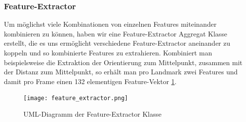 \subsubsection{Feature-Extractor}
Um möglichst viele Kombinationen von einzelnen Features miteinander kombinieren zu können, haben wir eine Feature-Extractor Aggregat
Klasse erstellt, die es uns ermöglicht verschiedene Feature-Extractor aneinander zu koppeln und so kombinierte Features zu extrahieren.
Kombiniert man beispielsweise die Extraktion der Orientierung zum Mittelpunkt, zusammen mit der Distanz zum Mittelpunkt, so erhält man
pro Landmark zwei Features und damit pro Frame einen 132 elementigen Feature-Vektor \ref{Implementierung.Feature-Extractor}.\newline

\begin{figure}
\begin{center}
\texttt{[image: feature\_extractor.png]}
\caption{UML-Diagramm der Feature-Extractor Klasse}
\end{center}
\label{Implementierung.Feature-Extractor}
\end{figure}




